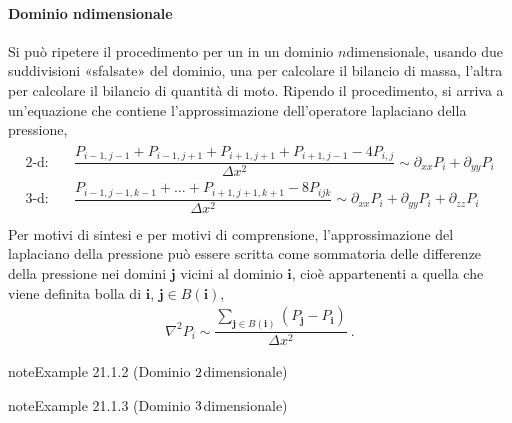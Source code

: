 \documentclass[letterpaper,10pt,italian]{jupyterBook}
\begin{document}
\paragraph{Dominio n\sphinxhyphen{}dimensionale}
\label{\detokenize{ch/waves/waves-in-physics:dominio-n-dimensionale}}\label{\detokenize{ch/waves/waves-in-physics:physics-hs-waves-equation-examples-fluids-sound-nd}}
\sphinxAtStartPar
Si può ripetere il procedimento per un {\hyperref[\detokenize{ch/waves/waves-in-physics:physics-hs-waves-equation-examples-fluids-sound-1d}]{}} in un dominio \(n\)\sphinxhyphen{}dimensionale, usando due suddivisioni «sfalsate» del dominio, una per calcolare il bilancio di massa, l’altra per calcolare il bilancio di quantità di moto. Ripendo il procedimento, si arriva a un’equazione che contiene l’approssimazione dell’operatore laplaciano della pressione,
\begin{equation*}
\begin{split}\begin{aligned}
 \text{2-d:} & \quad \dfrac{P_{i-1,j-1}+P_{i-1,j+1}+P_{i+1,j+1}+P_{i+1,j-1}-4 P_{i,j}}{\Delta x^2} \sim \partial_{xx} P_i + \partial_{yy} P_i \\
 \text{3-d:} & \quad \dfrac{P_{i-1,j-1,k-1}+\dots + P_{i+1,j+1,k+1}-8 P_{ijk}}{\Delta x^2} \sim \partial_{xx} P_i + \partial_{yy} P_i + \partial_{zz} P_i \\
\end{aligned}\end{split}
\end{equation*}
\sphinxAtStartPar
Per motivi di sintesi e per motivi di comprensione, l’approssimazione del laplaciano della pressione può essere scritta come sommatoria delle differenze della pressione nei domini \(\mathbf{j}\) vicini al dominio \(\mathbf{i}\), cioè appartenenti a quella che viene definita bolla di \(\mathbf{i}\), \(\mathbf{j} \in B(\mathbf{i})\),
\begin{equation*}
\begin{split}\nabla^2 P_i \sim \dfrac{\sum_{\mathbf{j} \in B(\mathbf{i})}\left( P_{\mathbf{j}} - P_{\mathbf{i}} \right)}{\Delta x^2} \ .\end{split}
\end{equation*}\label{ch/waves/waves-in-physics:example-1}
\begin{sphinxadmonition}{note}{Example 21.1.2 (Dominio \protect\(2\protect\)\sphinxhyphen{}dimensionale)}


\end{sphinxadmonition}
\label{ch/waves/waves-in-physics:example-2}
\begin{sphinxadmonition}{note}{Example 21.1.3 (Dominio \protect\(3\protect\)\sphinxhyphen{}dimensionale)}


\end{sphinxadmonition}
\end{document}
